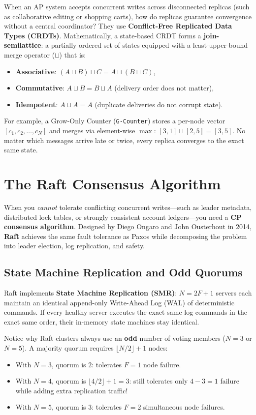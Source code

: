 When an AP system accepts concurrent writes across disconnected replicas (such as collaborative editing or shopping carts), how do replicas guarantee convergence without a central coordinator? They use \textbf{Conflict-Free Replicated Data Types (CRDTs)}. Mathematically, a state-based CRDT forms a \textbf{join-semilattice}: a partially ordered set of states equipped with a least-upper-bound merge operator ($\sqcup$) that is:
\begin{itemize}[leftmargin=18pt]
  \item \textbf{Associative}: $(A \sqcup B) \sqcup C = A \sqcup (B \sqcup C)$,
  \item \textbf{Commutative}: $A \sqcup B = B \sqcup A$ (delivery order does not matter),
  \item \textbf{Idempotent}: $A \sqcup A = A$ (duplicate deliveries do not corrupt state).
\end{itemize}
For example, a Grow-Only Counter (\texttt{G-Counter}) stores a per-node vector $[c_1, c_2, \dots, c_N]$ and merges via element-wise $\max$: $[3, 1] \sqcup [2, 5] = [3, 5]$. No matter which messages arrive late or twice, every replica converges to the exact same state.

\section{The Raft Consensus Algorithm}

When you \emph{cannot} tolerate conflicting concurrent writes---such as leader metadata, distributed lock tables, or strongly consistent account ledgers---you need a \textbf{CP consensus algorithm}. Designed by Diego Ongaro and John Ousterhout in 2014, \textbf{Raft} achieves the same fault tolerance as Paxos while decomposing the problem into leader election, log replication, and safety.

\subsection{State Machine Replication and Odd Quorums}

Raft implements \textbf{State Machine Replication (SMR)}: $N = 2F + 1$ servers each maintain an identical append-only Write-Ahead Log (WAL) of deterministic commands. If every healthy server executes the exact same log commands in the exact same order, their in-memory state machines stay identical.

Notice why Raft clusters always use an \textbf{odd} number of voting members ($N = 3$ or $N = 5$). A majority quorum requires $\lfloor N/2 \rfloor + 1$ nodes:
\begin{itemize}[leftmargin=18pt]
  \item With $N = 3$, quorum is $2$: tolerates $F = 1$ node failure.
  \item With $N = 4$, quorum is $\lfloor 4/2 \rfloor + 1 = 3$: still tolerates only $4 - 3 = 1$ failure while adding extra replication traffic!
  \item With $N = 5$, quorum is $3$: tolerates $F = 2$ simultaneous node failures.
\end{itemize}

